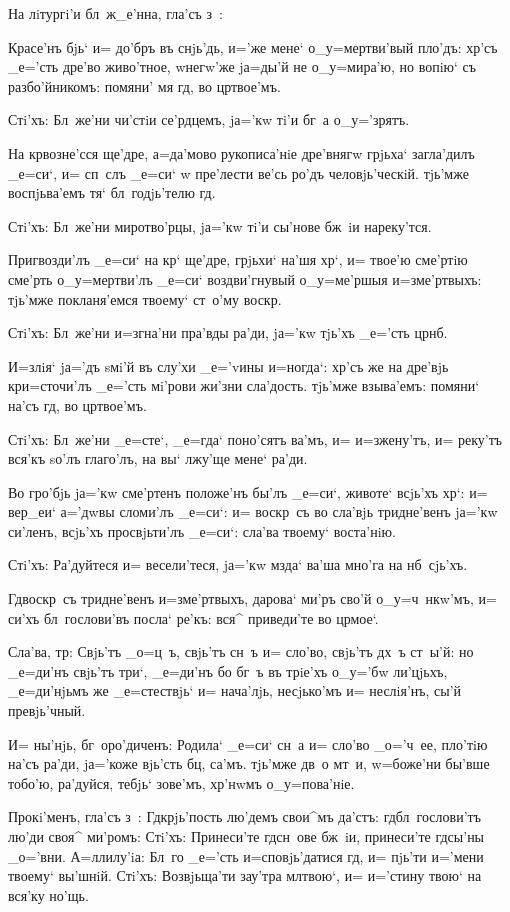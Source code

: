 На лiтургi'и бл~ж_е'нна, гла'съ з~:

Красе'нъ бjь` и= до'бръ въ снjь'дь, и='же мене` 
о_у=мертви'вый пло'дъ: хр'съ _е='сть дре'во 
живо'тное, w\т негw'же jа=ды'й не о_у=мира'ю, но вопiю` 
съ разбо'йникомъ: помяни' мя гд, во цр твое'мъ.

Стi'хъ: Бл~же'ни чи'стiи се'рдцемъ, jа='кw тi'и бг~а 
о_у='зрятъ.

На кр возне'сся ще'дре, а=да'мово рукописа'нiе 
дре'внягw грjьха` загла'дилъ _е=си`, и= сп~слъ _е=си` w\т 
пре'лести ве'сь ро'дъ человjь'ческiй. тjь'мже 
воспjьва'емъ тя` бл~годjь'телю гд.

Стi'хъ: Бл~же'ни миротво'рцы, jа='кw тi'и сы'нове 
бж~iи нареку'тся.

Пригвозди'лъ _е=си` на кр` ще'дре, грjьхи` на'шя 
хр`, и= твое'ю сме'ртiю сме'рть о_у=мертви'лъ _е=си` 
воздви'гнувый о_у=ме'ршыя и=з\ъ ме'ртвыхъ: тjь'мже 
покланя'емся твоему` ст~о'му воскр.

Стi'хъ: Бл~же'ни и=згна'ни пра'вды ра'ди, jа='кw 
тjь'хъ _е='сть цр нб.

И=злiя` jа='дъ sмi'й въ слу'хи _е='vины и=ногда`: 
хр'съ же на дре'вjь кр и=сточи'лъ _е='сть 
мi'рови жи'зни сла'дость. тjь'мже взыва'емъ: помяни` 
на'съ гд, во цр твое'мъ.

Стi'хъ: Бл~же'ни _е=сте`, _е=гда` поно'сятъ ва'мъ, и= 
и=зжену'тъ, и= реку'тъ вся'къ sо'лъ глаго'лъ, на вы` 
лжу'ще мене` ра'ди.

Во гро'бjь jа='кw сме'ртенъ положе'нъ бы'лъ _е=си`, 
животе` всjь'хъ хр`: и= вер_еи` а='дwвы сломи'лъ 
_е=си`: и= воскр~съ во сла'вjь тридне'венъ jа='кw 
си'ленъ, всjь'хъ просвjьти'лъ _е=си`: сла'ва твоему` 
воста'нiю.

Стi'хъ: Ра'дуйтеся и= весели'теся, jа='кw мзда` ва'ша 
мно'га на нб~сjь'хъ.

Гд воскр~съ тридне'венъ и=з\ъ ме'ртвыхъ, дарова` 
ми'ръ сво'й о_у=ч~нкw'мъ, и= си'хъ бл~гослови'въ посла` 
ре'къ: вся^ приведи'те во цр мое`.

Сла'ва, тр: Свjь'тъ _о=ц~ъ, свjь'тъ сн~ъ и= 
сло'во, свjь'тъ дх~ъ ст~ы'й: но _е=ди'нъ свjь'тъ три`, 
_е=ди'нъ бо бг~ъ въ трiе'хъ о_у='бw ли'цjьхъ, _е=ди'нjьмъ 
же _е=стествjь` и= нача'лjь, несjько'мъ и= неслiя'нъ, 
сы'й превjь'чный.

И= ны'нjь, бг~оро'диченъ: Родила` _е=си` сн~а и= 
сло'во _о='ч~ее, пло'тiю на'съ ра'ди, jа='коже вjь'сть 
бц, са'мъ. тjь'мже дв~о мт~и, w=боже'ни бы'вше тобо'ю, 
ра'дуйся, тебjь` зове'мъ, хр'нwмъ о_у=пова'нiе.

Прокi'менъ, гла'съ з~: Гд крjь'пость лю'демъ 
свои^мъ да'стъ: гд бл~гослови'тъ лю'ди своя^ ми'ромъ: 
Стi'хъ: Принеси'те гд сн~ове бж~iи, принеси'те 
гд сы'ны _о='вни. А=ллилу'iа: Бл~го _е='сть 
и=сповjь'датися гд, и= пjь'ти и='мени твоему` 
вы'шнiй. Стi'хъ: Возвjьща'ти зау'тра мл твою`, и= 
и='стину твою` на вся'ку но'щь.

